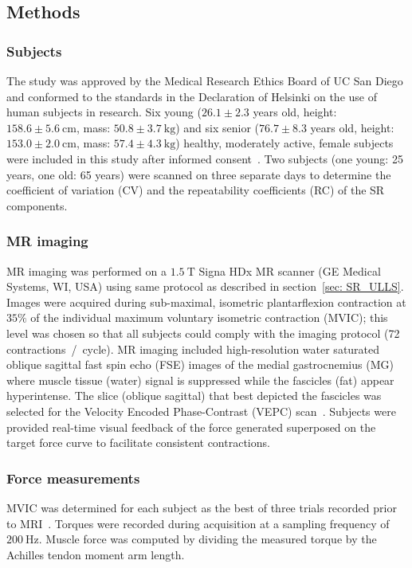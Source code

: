 \subsection{Methods}
\subsubsection{Subjects}
The study was approved by the Medical Research Ethics Board of UC San Diego and conformed to the standards in the Declaration of Helsinki on the use of human subjects in research.
Six young ($26.1 \pm 2.3$ years old, height: $158.6 \pm \SI{5.6}{\centi\meter}$, mass: $50.8 \pm \SI{3.7}{\kilogram}$) and six senior ($76.7 \pm 8.3$ years old, height: $153.0 \pm \SI{2.0}{\centi\meter}$, mass: $57.4 \pm \SI{4.3}{\kilogram}$) healthy, moderately active, female subjects were included in this study after informed consent~\cite{RNS16}. 
Two subjects (one young: 25 years, one old: 65 years) were scanned on three separate days to determine the coefficient of variation (CV) and the repeatability coefficients (RC) of the SR components. 
\subsubsection{MR imaging}
MR imaging was performed on a $\SI{1.5}{\tesla}$ Signa HDx MR scanner (GE Medical Systems, WI, USA) using same protocol as described in section~\ref{sec: SR_ULLS}. 
Images were acquired during sub-maximal, isometric plantarflexion contraction at $35\%$ of the individual maximum voluntary isometric contraction (MVIC); this level was chosen so that all subjects could comply with the imaging protocol (72 contractions~/~cycle). 
MR imaging included high-resolution water saturated oblique sagittal fast spin echo (FSE) images of the medial gastrocnemius (MG) where muscle tissue (water) signal is suppressed while the fascicles (fat) appear hyperintense. 
The slice (oblique sagittal) that best depicted the fascicles was selected for the Velocity Encoded Phase-Contrast (VEPC) scan~\cite{RNS16}.
Subjects were provided real-time visual feedback of the force generated superposed on the target force curve to facilitate consistent contractions.
\subsubsection{Force measurements}
MVIC was determined for each subject as the best of three trials recorded prior to MRI~\cite{RNS16, RNSS10}. 
Torques were recorded during acquisition at a sampling frequency of $\SI{200}{\hertz}$.
Muscle force was computed by dividing the measured torque by the Achilles tendon moment arm length.
